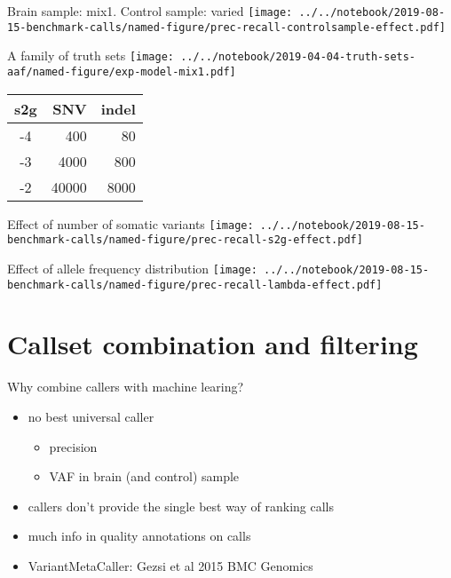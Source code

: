 \documentclass{beamer}
\begin{document}
\begin{frame}{Brain sample: mix1. Control sample: varied}
\texttt{[image: ../../notebook/2019-08-15-benchmark-calls/named-figure/prec-recall-controlsample-effect.pdf]}
\end{frame}

\begin{frame}[label=familyoftruthsets]{A family of truth sets}
\texttt{[image: ../../notebook/2019-04-04-truth-sets-aaf/named-figure/exp-model-mix1.pdf]}
{\tiny
\begin{tabular}{c|r|r}
s2g & SNV & indel \\
\hline
-4 & 400 & 80 \\
-3 & 4000 & 800 \\
-2 & 40000 & 8000 \\
\end{tabular}
}
\end{frame}

\begin{frame}{Effect of number of somatic variants}
\texttt{[image: ../../notebook/2019-08-15-benchmark-calls/named-figure/prec-recall-s2g-effect.pdf]}
\end{frame}


\begin{frame}{Effect of allele frequency distribution}
\texttt{[image: ../../notebook/2019-08-15-benchmark-calls/named-figure/prec-recall-lambda-effect.pdf]}
\end{frame}

\section{Callset combination and filtering}

\begin{frame}{Why combine callers with machine learing?}
\begin{itemize}
\item no best universal caller
\begin{itemize}
\item precision
\item VAF in brain (and control) sample
\end{itemize}
\item callers don't provide the single best way of ranking calls
\item much info in quality annotations on calls
\item VariantMetaCaller: Gezsi et al 2015 BMC Genomics 
\end{itemize}
\end{frame}
\end{document}
